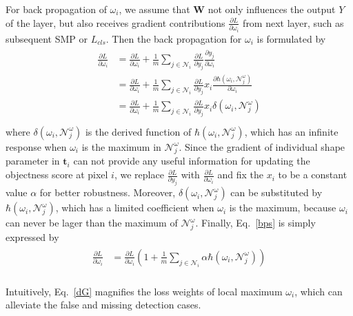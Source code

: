 For back propagation of $\omega_i$, we assume that $\mathbf{W}$ not only influences the output $Y$ of the layer, but also receives gradient contributions $\frac{\partial L}{\partial \omega_{i}}$ from next layer, such as subsequent SMP or $L_{cls}$.
Then the back propagation for $\omega_{i}$ is formulated by
%
\begin{eqnarray}\label{bps}
\begin{aligned}
\frac{\partial L}{\partial \omega_{i}}&=\frac{\partial L}{\partial \omega_{i}}+\frac{1}{m}\sum_{j\in\mathcal{N}_{i}}\frac{\partial L}{\partial y_{j}}\frac{\partial y_{j}}{\partial \omega_{i}}\\
&=\frac{\partial L}{\partial \omega_{i}}+\frac{1}{m}\sum_{j\in\mathcal{N}_{i}}\frac{\partial L}{\partial y_{j}}x_{i}\frac{\partial \hbar(\omega_{i},\mathcal{N}^{\omega}_{j})}{\partial \omega_{i}}\\
&=\frac{\partial L}{\partial \omega_{i}}+\frac{1}{m}\sum_{j\in\mathcal{N}_{i}}\frac{\partial L}{\partial y_{j}}x_{i}\delta(\omega_{i},\mathcal{N}^{\omega}_{j})\\
\end{aligned}
\end{eqnarray}
where $\delta(\omega_{i},\mathcal{N}^{\omega}_{j})$ is the derived function of $\hbar(\omega_{i},\mathcal{N}^{\omega}_{j})$, which has an infinite response when $\omega_{i}$ is the maximum in $\mathcal{N}^{\omega}_{j}$.
Since the gradient of individual shape parameter in $\mathbf{t}_i$ can not provide any useful information for updating the objectness score at pixel $i$, we replace $\frac{\partial L}{\partial y_{j}}$ with $\frac{\partial L}{\partial \omega_{i}}$ and fix the $x_i$ to be a constant value $\alpha$ for better robustness.
Moreover, $\delta(\omega_{i},\mathcal{N}^{\omega}_{j})$ can be substituted by $\hbar(\omega_{i},\mathcal{N}^{\omega}_{j})$, which has a limited coefficient when $\omega_{i}$ is the maximum, because $\omega_i$ can never be lager than the maximum of $\mathcal{N}^{\omega}_{j}$.
Finally, Eq.~\ref{bps} is simply expressed by
\begin{eqnarray}\label{dG}
\begin{aligned}
\frac{\partial L}{\partial \omega_{i}}&=\frac{\partial L}{\partial \omega_{i}}(1+\frac{1}{m}\sum_{j\in\mathcal{N}_{i}}\alpha \hbar(\omega_{i},\mathcal{N}^{\omega}_{j}))\\
\end{aligned}
\end{eqnarray}

Intuitively, Eq.~\ref{dG} magnifies the loss weights of local maximum $\omega_{i}$, which can alleviate the false and missing detection cases.

